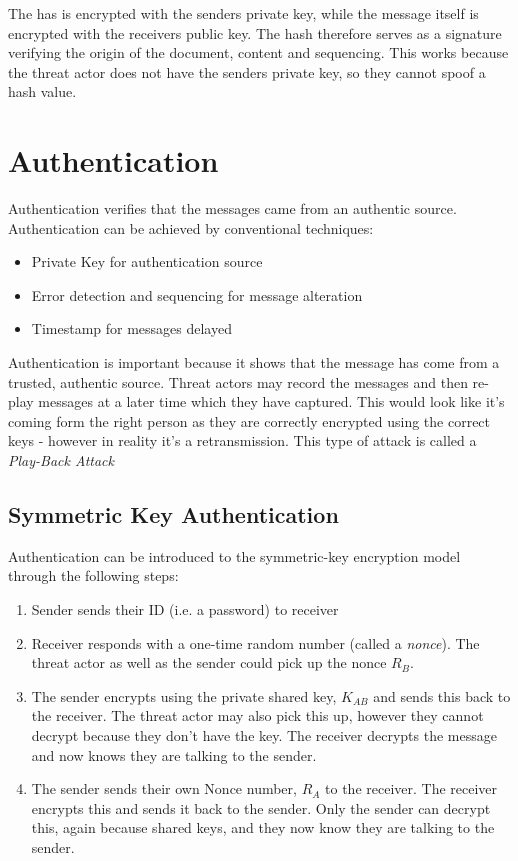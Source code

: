 The has is encrypted with the senders private key, while the message itself is encrypted with the receivers public key. The hash therefore serves as a signature verifying the origin of the document, content and sequencing. This works because the threat actor does not have the senders private key, so they cannot spoof a hash value. 

\section{Authentication}
Authentication verifies that the messages came from an authentic source. Authentication can be achieved by conventional techniques:
\begin{itemize}
    \item Private Key for authentication source
    \item Error detection and sequencing for message alteration 
    \item Timestamp for messages delayed 
\end{itemize}

Authentication is important because it shows that the message has come from a trusted, authentic source. Threat actors may record the messages and then re-play messages at a later time which they have captured. This would look like it's coming form the right person as they are correctly encrypted using the correct keys - however in reality it's a retransmission. This type of attack is called a \textit{Play-Back Attack}

\subsection{Symmetric Key Authentication}
Authentication can be introduced to the symmetric-key encryption model through the following steps:
\begin{enumerate}
    \item Sender sends their ID (i.e. a password) to receiver
    \item Receiver responds with a one-time random number (called a \textit{nonce}). The threat actor as well as the sender could pick up the nonce $R_B$. 
    \item The sender encrypts using the private shared key, $K_{AB}$ and sends this back to the receiver. The threat actor may also pick this up, however they cannot decrypt because they don't have the key. The receiver decrypts the message and now knows they are talking to the sender.
    \item The sender sends their own Nonce number, $R_A$ to the receiver. The receiver encrypts this and sends it back to the sender. Only the sender can decrypt this, again because shared keys, and they now know they are talking to the sender. 
\end{enumerate}

